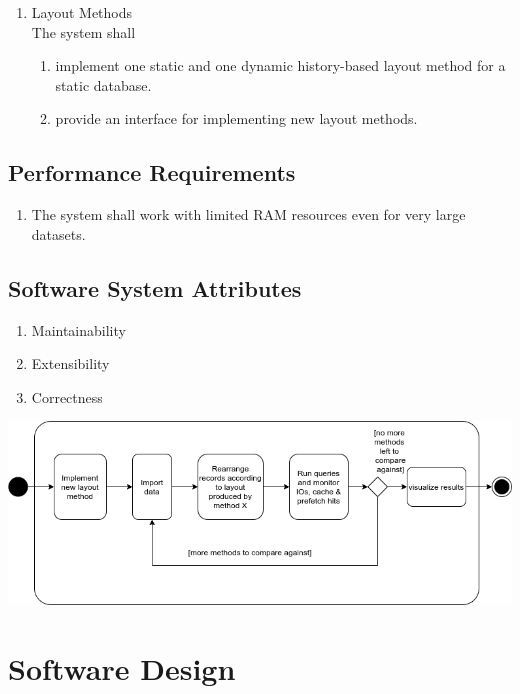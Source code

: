 \begin{enumerate}[label*=\arabic*]
\item Layout Methods \\
    The system shall
\begin{enumerate}[label*=\arabic*]
	\item implement one static and one dynamic history-based layout method for a static database.
	\item provide an interface for implementing new layout methods.
\end{enumerate}
\end{enumerate}

\subsection{Performance Requirements}
\begin{enumerate}[label*=\arabic*]
		\item The system shall work with limited RAM resources even for very large datasets.
\end{enumerate}

\subsection{Software System Attributes}
\begin{enumerate}[label*=\arabic*]
    \item Maintainability
    \item Extensibility
    \item Correctness
\end{enumerate} \vspace{2em}
		
		
\begin{center}
 \includegraphics[keepaspectratio, width=1\textwidth, height=\textheight]{img/activity.png}
\end{center}
		\newpage
		
\section{Software Design}
